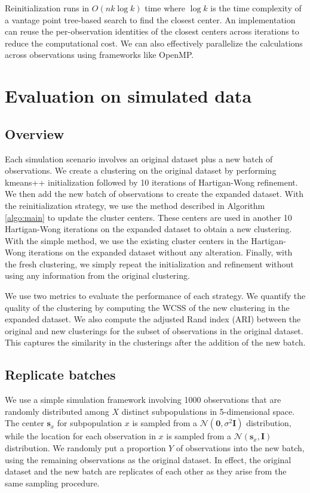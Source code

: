 \documentclass{article}
\begin{document}
Reinitialization runs in $O(nk\log k)$ time where $\log k$ is the time complexity of a vantage point tree-based search \cite{yianilos1993data} to find the closest center.
An implementation can reuse the per-observation identities of the closest centers across iterations to reduce the computational cost.
We can also effectively parallelize the calculations across observations using frameworks like OpenMP.

\section{Evaluation on simulated data}

\subsection{Overview}

Each simulation scenario involves an original dataset plus a new batch of observations.
We create a clustering on the original dataset by performing kmeans++ initialization \cite{vassilvitskii2006kmeanspp} followed by 10 iterations of Hartigan-Wong refinement.
We then add the new batch of observations to create the expanded dataset.
With the reinitialization strategy, we use the method described in Algorithm \ref{algo:main} to update the cluster centers.
These centers are used in another 10 Hartigan-Wong iterations on the expanded dataset to obtain a new clustering.
With the simple method, we use the existing cluster centers in the Hartigan-Wong iterations on the expanded dataset without any alteration.
Finally, with the fresh clustering, we simply repeat the initialization and refinement without using any information from the original clustering.

We use two metrics to evaluate the performance of each strategy.
We quantify the quality of the clustering by computing the WCSS of the new clustering in the expanded dataset.
We also compute the adjusted Rand index (ARI) between the original and new clusterings for the subset of observations in the original dataset.
This captures the similarity in the clusterings after the addition of the new batch.

\subsection{Replicate batches}
\label{sec:repbatch}

We use a simple simulation framework involving 1000 observations that are randomly distributed among $X$ distinct subpopulations in 5-dimensional space.
The center $\mathbf{s}_x$ for subpopulation $x$ is sampled from a $\mathcal{N}(\mathbf{0}, \sigma^2 \mathbf{I})$ distribution,
while the location for each observation in $x$ is sampled from a $\mathcal{N}(\mathbf{s}_x, \mathbf{I})$ distribution.
We randomly put a proportion $Y$ of observations into the new batch, using the remaining observations as the original dataset.
In effect, the original dataset and the new batch are replicates of each other as they arise from the same sampling procedure.
\end{document}
